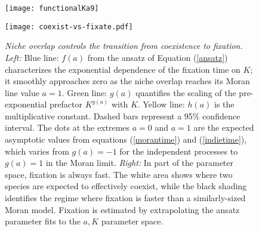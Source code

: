 

\begin{figure}[h]
	\centering
	\begin{minipage}{0.59\linewidth}
		\centering
		\texttt{[image: functionalKa9]}
	\end{minipage}
	\begin{minipage}{0.39\linewidth}
		\centering
		\texttt{[image: coexist-vs-fixate.pdf]}
	\end{minipage}
	\caption{\emph{Niche overlap controls the transition from coexistence to fixation.}
		\emph{Left:} Blue line: $f(a)$ from the ansatz of Equation (\ref{ansatz}) characterizes the exponential dependence of the fixation time on $K$; it  smoothly approaches zero as the niche overlap reaches its Moran line value $a=1$. Green line: $g(a)$ quantifies the scaling of the pre-exponential prefactor $K^{g(a)}$ with $K$. Yellow line: $h(a)$ is the multiplicative constant. Dashed bars represent a 95\% confidence interval. The dots at the extremes $a=0$ and $a=1$ are the expected asymptotic values from equations (\ref{morantime}) and (\ref{indietime}), which varies from $g(a)=-1$ for the independent processes to $g(a)=1$ in the Moran limit. 
		\emph{Right:} In part of the parameter space, fixation is always fast. The white area shows where two species are expected to effectively coexist, while the black shading identifies the regime where fixation is faster than a similarly-sized Moran model. Fixation is estimated by extrapolating the ansatz parameter fits to the $a,K$ parameter space. %
	} \label{ansatzplot}
\end{figure}

